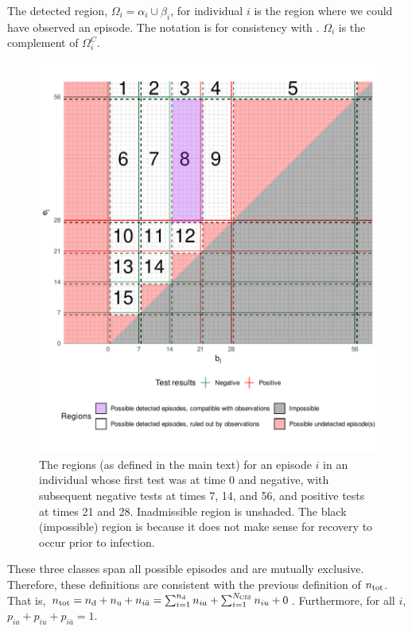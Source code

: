 \documentclass[thesis.tex]{subfiles}
\begin{document}
The detected region, $\Omega_i = \alpha_i \cup \beta_i$, for individual $i$ is the region where we could have observed an episode. 
The notation is for consistency with \textcite{heiseyModelling}.
$\Omega_i$ is the complement of $\Omega^C_i$.

\begin{figure}
\includegraphics[width=\textwidth]{cis-perfect-testing/regions_diag}
\caption[Admissible, inadmissible, and undetected infections]{The regions (as defined in the main text) for an episode $i$ in an
individual whose first test was at time 0 and negative, with subsequent
negative tests at times 7, 14, and 56, and positive tests at times 21
and 28. Inadmissible region is unshaded. The black (impossible) region is because it does not make sense for recovery to occur prior to infection. \label{perf-test:fig:partitionSpace}}
\end{figure}

These three classes span all possible episodes and are mutually exclusive.
Therefore, these definitions are consistent with the previous definition of $n_\text{tot}$.
That is, $n_\text{tot} = n_\text{d} + n_\text{u} + n_{i\bar{a}} = \sum_{i=1}^{n_\text{d}} n_{ia} + \sum_{i=1}^{N_\text{CIS}} n_{iu} + 0$.
Furthermore, for all $i$, $p_{ia} + p_{iu} + p_{i\bar{a}} = 1$.
\end{document}
